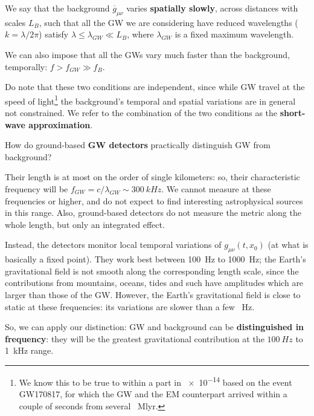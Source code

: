 \documentclass[main.tex]{subfiles}
\begin{document}
We say that the background \(\overline{g}_{\mu \nu }\) varies \textbf{spatially slowly}, across distances with scales \(L_B\), such that all the GW we are considering have reduced wavelengths (\(k = \lambda /2 \pi \)) satisfy \(\lambda  \leq \lambda_{GW} \ll L_B\), where \(\lambda_{GW}\) is a fixed maximum wavelength. 

We can also impose that all the GWs vary much faster than the background, temporally: \(f > f_{GW} \gg f_B\). 

Do note that these two conditions are independent, since while GW travel at the speed of light\footnote{We know this to be true to within a part in \num{e-14} based on the event GW170817, for which the GW and the EM counterpart arrived within a couple of seconds from several \SI{}{Mlyr}.} the background's temporal and spatial variations are in general not constrained. 
We refer to the combination of the two conditions as the \textbf{short-wave approximation}. 

How do ground-based \textbf{GW detectors} practically distinguish GW from background? 

Their length is at most on the order of single kilometers: so, their characteristic frequency will be \(f_{GW} = c / \lambda_{GW}  \sim \SI{300}{kHz}\).
We cannot measure at these frequencies or higher, and do not expect to find interesting astrophysical sources in this range.
Also, ground-based detectors do not measure the metric along the whole length, but only an integrated effect. 

Instead, the detectors monitor local temporal variations of \(g_{\mu \nu } (t, x_0 )\) (at what is basically a fixed point). 
They work best between \SI{100}{Hz} to \SI{1000}{Hz}; the Earth's gravitational field is not smooth along the corresponding length scale, since the contributions from mountains, oceans, tides and such have amplitudes which are larger than those of the GW.
However, the Earth's gravitational field is close to static at these frequencies: its variations are slower than a few \SI{}{Hz}.

So, we can apply our distinction: GW and background can be \textbf{distinguished in frequency}: they will be the greatest gravitational contribution at the \(\SI{100}{Hz}\) to \SI{1}{kHz} range. 
\end{document}

